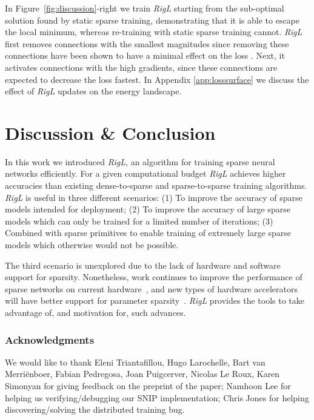 \documentclass{article}
\begin{document}
In Figure~\ref{fig:discussion}-right we train {\em RigL} starting from the sub-optimal solution found by static sparse training, demonstrating that it is able to escape the local minimum, whereas re-training with static sparse training cannot. {\em RigL} first removes connections with the smallest magnitudes since removing these connections have been shown to have a minimal effect on the loss \citep{han2015learning, evci2018}. Next, it activates connections with the high gradients, since these connections are expected to decrease the loss fastest. In Appendix \ref{app:losssurface} we discuss the effect of \textit{RigL} updates on the energy landscape.

\section{Discussion \& Conclusion}
In this work we introduced \textit{RigL}, an algorithm for training sparse neural networks efficiently. For a given computational budget \textit{RigL} achieves higher accuracies than existing dense-to-sparse and sparse-to-sparse training algorithms.
\textit{RigL} is useful in three different scenarios: (1) To improve the accuracy of sparse models intended for deployment; (2) To improve the accuracy of large sparse models which can only be trained for a limited number of iterations; (3) Combined with sparse primitives to enable training of extremely large sparse models which otherwise would not be possible.

The third scenario is unexplored due to the lack of hardware and software support for sparsity.
Nonetheless, work continues to improve the performance of sparse networks on current hardware~\citep{AdaptiveSparseTilingGPU, Merrill_MergePath_SpMV}, and new types of hardware accelerators will have better support for parameter sparsity~\citep{snnramsparsehardware, myrtleunstructured, Liu2018MemoryEfficientDL, Han2016, eyeriss_sparse_accelerator}. \textit{RigL} provides the tools to take advantage of, and motivation for, such advances.


\subsubsection*{Acknowledgments}
We would like to thank Eleni Triantafillou, Hugo Larochelle, Bart van Merriënboer, Fabian Pedregosa, Joan Puigcerver, Nicolas Le Roux, Karen Simonyan for giving feedback on the preprint of the paper; Namhoon Lee for helping us verifying/debugging our SNIP implementation; Chris Jones for helping discovering/solving the distributed training bug.
\end{document}
